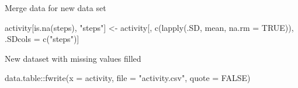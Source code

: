 \documentclass[
]{article}
\newenvironment{Shaded}{\begin{snugshade}}{\end{snugshade}}
\newcommand{\AttributeTok}[1]{\textcolor[rgb]{0.77,0.63,0.00}{#1}}
\newcommand{\ConstantTok}[1]{\textcolor[rgb]{0.00,0.00,0.00}{#1}}
\newcommand{\ControlFlowTok}[1]{\textcolor[rgb]{0.13,0.29,0.53}{\textbf{#1}}}
\newcommand{\DecValTok}[1]{\textcolor[rgb]{0.00,0.00,0.81}{#1}}
\newcommand{\FunctionTok}[1]{\textcolor[rgb]{0.00,0.00,0.00}{#1}}
\newcommand{\NormalTok}[1]{#1}
\newcommand{\OtherTok}[1]{\textcolor[rgb]{0.56,0.35,0.01}{#1}}
\newcommand{\SpecialCharTok}[1]{\textcolor[rgb]{0.00,0.00,0.00}{#1}}
\newcommand{\StringTok}[1]{\textcolor[rgb]{0.31,0.60,0.02}{#1}}
\begin{document}
\begin{Shaded}
\end{Shaded}

Merge data for new data set

\begin{Shaded}
\begin{Highlighting}[]
\NormalTok{activity[}\FunctionTok{is.na}\NormalTok{(steps), }\StringTok{"steps"}\NormalTok{] }\OtherTok{\textless{}{-}}\NormalTok{ activity[, }\FunctionTok{c}\NormalTok{(}\FunctionTok{lapply}\NormalTok{(.SD, mean, }\AttributeTok{na.rm =} \ConstantTok{TRUE}\NormalTok{)), .SDcols }\OtherTok{=} \FunctionTok{c}\NormalTok{(}\StringTok{"steps"}\NormalTok{)]}
\end{Highlighting}
\end{Shaded}

New dataset with missing values filled

\begin{Shaded}
\begin{Highlighting}[]
\NormalTok{data.table}\SpecialCharTok{::}\FunctionTok{fwrite}\NormalTok{(}\AttributeTok{x =}\NormalTok{ activity, }\AttributeTok{file =} \StringTok{"activity.csv"}\NormalTok{, }\AttributeTok{quote =} \ConstantTok{FALSE}\NormalTok{)}
\end{Highlighting}
\end{Shaded}
\end{document}
